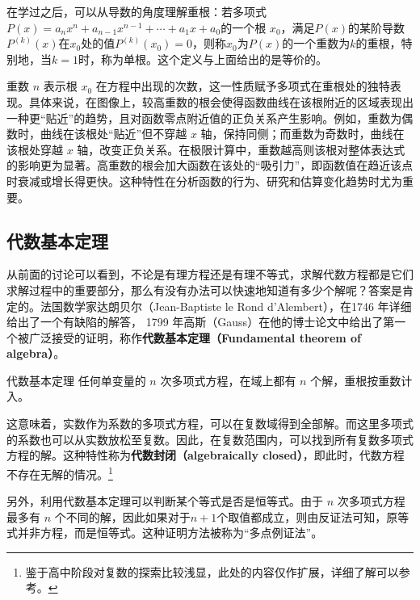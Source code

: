 在学过之后，可以从导数的角度理解重根：若多项式 $P(x) = a_n x^n + a_{n-1} x^{n-1} + \cdots + a_1 x + a_0$的一个根 $x_0$，满足$P(x)$的某阶导数$P^{(k)}(x)$在$x_0$处的值$P^{(k)}(x_0)=0$，则称$x_0$为$P(x)$的一个重数为$k$的重根，特别地，当$k=1$时，称为单根。这个定义与上面给出的是等价的。

重数 $n$ 表示根 $x_0$ 在方程中出现的次数，这一性质赋予多项式在重根处的独特表现。具体来说，在图像上，较高重数的根会使得函数曲线在该根附近的区域表现出一种更“贴近”的趋势，且对函数零点附近值的正负关系产生影响。例如，重数为偶数时，曲线在该根处“贴近”但不穿越 $x$ 轴，保持同侧；而重数为奇数时，曲线在该根处穿越 $x$ 轴，改变正负关系。在极限计算中，重数越高则该根对整体表达式的影响更为显著。高重数的根会加大函数在该处的“吸引力”，即函数值在趋近该点时衰减或增长得更快。这种特性在分析函数的行为、研究和估算变化趋势时尤为重要。

\subsection{代数基本定理}

从前面的讨论可以看到，不论是有理方程还是有理不等式，求解代数方程都是它们求解过程中的重要部分，那么有没有办法可以快速地知道有多少个解呢？答案是肯定的。法国数学家达朗贝尔（Jean-Baptiste le Rond d'Alembert），在1746 年详细给出了一个有缺陷的解答， 1799 年高斯（Gauss）在他的博士论文中给出了第一个被广泛接受的证明，称作\textbf{代数基本定理（Fundamental theorem of algebra）}。

\begin{theorem}{代数基本定理}\label{the_SolEqI_1}
任何单变量的 $n$ 次多项式方程，在域上都有 $n$ 个解，重根按重数计入。
\end{theorem}

这意味着，实数作为系数的多项式方程，可以在复数域得到全部解。而这里多项式的系数也可以从实数放松至复数。因此，在复数范围内，可以找到所有复数多项式方程的解。这种特性称为\textbf{代数封闭（algebraically closed）}，即此时，代数方程不存在无解的情况。\footnote{鉴于高中阶段对复数的探索比较浅显，此处的内容仅作扩展，详细了解可以参考。}

另外，利用代数基本定理可以判断某个等式是否是恒等式。由于 $n$ 次多项式方程最多有 $n$ 个不同的解，因此如果对于$n+1$个取值都成立，则由反证法可知，原等式并非方程，而是恒等式。这种证明方法被称为“多点例证法”。